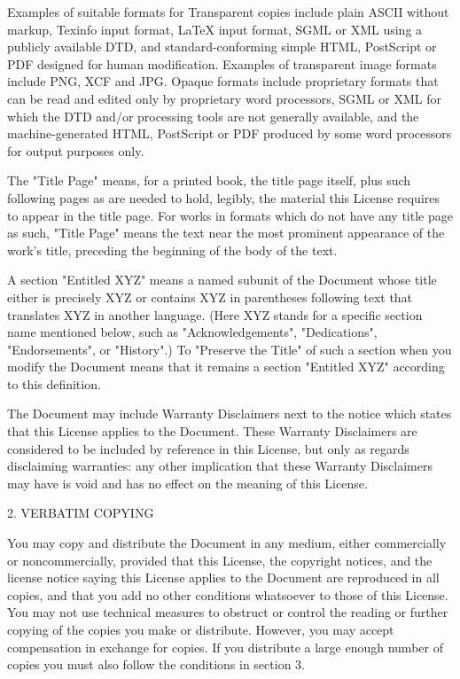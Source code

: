 \documentclass[oneside,english,a4paper,10pt,oneside,openany,final]{memoir}
\begin{document}
Examples of suitable formats for Transparent copies include plain ASCII without markup, Texinfo input format, LaTeX input format, SGML or XML using a publicly available DTD, and standard-conforming simple HTML, PostScript or PDF designed for human modification. Examples of transparent image formats include PNG, XCF and JPG. Opaque formats include proprietary formats that can be read and edited only by proprietary word processors, SGML or XML for which the DTD and/or processing tools are not generally available, and the machine-generated HTML, PostScript or PDF produced by some word processors for output purposes only.

The "Title Page" means, for a printed book, the title page itself, plus such following pages as are needed to hold, legibly, the material this License requires to appear in the title page. For works in formats which do not have any title page as such, "Title Page" means the text near the most prominent appearance of the work's title, preceding the beginning of the body of the text.

A section "Entitled XYZ" means a named subunit of the Document whose title either is precisely XYZ or contains XYZ in parentheses following text that translates XYZ in another language. (Here XYZ stands for a specific section name mentioned below, such as "Acknowledgements", "Dedications", "Endorsements", or "History".) To "Preserve the Title" of such a section when you modify the Document means that it remains a section "Entitled XYZ" according to this definition.

The Document may include Warranty Disclaimers next to the notice which states that this License applies to the Document. These Warranty Disclaimers are considered to be included by reference in this License, but only as regards disclaiming warranties: any other implication that these Warranty Disclaimers may have is void and has no effect on the meaning of this License.

2. VERBATIM COPYING

You may copy and distribute the Document in any medium, either commercially or noncommercially, provided that this License, the copyright notices, and the license notice saying this License applies to the Document are reproduced in all copies, and that you add no other conditions whatsoever to those of this License. You may not use technical measures to obstruct or control the reading or further copying of the copies you make or distribute. However, you may accept compensation in exchange for copies. If you distribute a large enough number of copies you must also follow the conditions in section 3.
\end{document}

